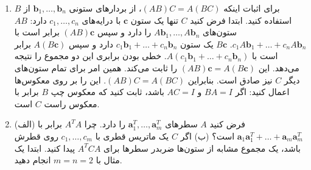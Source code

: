 \documentclass[12pt, a4paper]{book}
\begin{document}
\begin{enumerate}
		\item برای اثبات اینکه $(AB)C = A(BC)$، از بردارهای ستونی $\mathbf{b}_1, \dots, \mathbf{b}_n$ از $B$ استفاده کنید. ابتدا فرض کنید $C$ تنها یک ستون $\mathbf{c}$ با درایه‌های $c_1, \dots, c_n$ دارد:
		$AB$ ستون‌های $A\mathbf{b}_1, \dots, A\mathbf{b}_n$ را دارد و سپس $(AB)\mathbf{c}$ برابر است با $c_1A\mathbf{b}_1 + \dots + c_nA\mathbf{b}_n$.
		$B\mathbf{c}$ یک ستون $c_1\mathbf{b}_1 + \dots + c_n\mathbf{b}_n$ دارد و سپس $A(B\mathbf{c})$ برابر است با $A(c_1\mathbf{b}_1 + \dots + c_n\mathbf{b}_n)$.
		خطی بودن برابری این دو مجموع را نتیجه می‌دهد. این $(AB)\mathbf{c} = A(B\mathbf{c})$ را ثابت می‌کند. همین امر برای تمام ستون‌های دیگر $C$ نیز صادق است. بنابراین $(AB)C=A(BC)$. این را بر روی معکوس‌ها اعمال کنید:
		اگر $BA=I$ و $AC=I$ باشد، ثابت کنید که معکوس چپ $B$ برابر با معکوس راست $C$ است.
		
		\item (الف) فرض کنید $A$ سطرهای $\mathbf{a}_1^T, \dots, \mathbf{a}_m^T$ را دارد. چرا $A^TA$ برابر با $\mathbf{a}_1\mathbf{a}_1^T + \dots + \mathbf{a}_m\mathbf{a}_m^T$ است؟
		(ب) اگر $C$ یک ماتریس قطری با $c_1, \dots, c_m$ روی قطرش باشد، یک مجموع مشابه از ستون‌ها ضربدر سطرها برای $A^TCA$ پیدا کنید. ابتدا یک مثال با $m=n=2$ انجام دهید.
	\end{enumerate}
	
\end{document}
